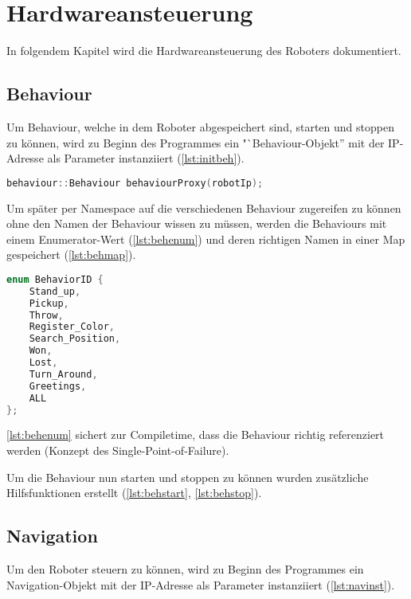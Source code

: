 \chapter{Hardwareansteuerung}

    In folgendem Kapitel wird die Hardwareansteuerung des Roboters dokumentiert.

    \section{Behaviour}

        Um Behaviour, welche in dem Roboter abgespeichert sind, starten und
        stoppen zu können, wird zu Beginn des Programmes ein
        "`Behaviour-Objekt'' mit der \ac{IP}-Adresse als Parameter instanziiert
        (\autoref{lst:initbeh}).

\begin{lstlisting}[language=c++,
                   caption={Initialisierung Behaviour},
                   label={lst:initbeh}]
behaviour::Behaviour behaviourProxy(robotIp);
\end{lstlisting}

        Um später per Namespace auf die verschiedenen Behaviour zugereifen zu
        können ohne den Namen der Behaviour wissen zu müssen, werden die
        Behaviours mit einem Enumerator-Wert (\autoref{lst:behenum}) und deren
        richtigen Namen in einer Map gespeichert (\autoref{lst:behmap}).

\begin{lstlisting}[language=c++,
                   caption={Behaviour Enumerator},
                   label={lst:behenum}]
enum BehaviorID {
    Stand_up,
    Pickup,
    Throw,
    Register_Color,
    Search_Position,
    Won,
    Lost,
    Turn_Around,
    Greetings,
    ALL
};
\end{lstlisting}

        \autoref{lst:behenum} sichert zur Compiletime, dass die Behaviour
        richtig referenziert werden (Konzept des Single-Point-of-Failure).

        Um die Behaviour nun starten und stoppen zu können wurden zusätzliche
        Hilfsfunktionen erstellt
        (\autoref{lst:behstart}, \autoref{lst:behstop}).

    \section{Navigation}

        Um den Roboter steuern zu können, wird zu Beginn des Programmes ein
        Navigation-Objekt mit der \ac{IP}-Adresse als Parameter instanziiert
        (\autoref{lst:navinst}).

